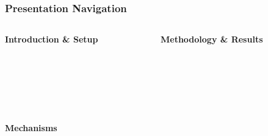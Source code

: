 \documentclass{beamer}
\begin{document}
\begin{frame}
    \label{frame:navigation}
    \frametitle{Presentation Navigation}
    
    \small %
    
    \begin{columns}[T]
        \begin{column}{0.45\textwidth}
            \centering
            \textbf{Introduction \& Setup}
            \vspace{0.1cm}
            
            \hyperlink{frame:motivation}{}\\[2pt]
            \hyperlink{frame:thispaper}{}\\[2pt]
            \hyperlink{frame:contribution}{}\\[2pt]
            \hyperlink{frame:background}{}\\[2pt]
            \hyperlink{frame:data}{}\\[2pt]
            \hyperlink{frame:trends}{}
            
            \vspace{0.2cm}
            \textbf{Mechanisms}
            \vspace{0.1cm}
            
            \hyperlink{frame:mechanisms}{}\\[2pt]
            \hyperlink{frame:birthorder}{}\\[2pt]
            \hyperlink{frame:ses}{}\\[2pt]
            \hyperlink{frame:pcinternet}{}\\[2pt]
            \hyperlink{frame:siblingdisruption}{}\\[2pt]
            \hyperlink{frame:parentaldilution}{}
        \end{column}
        
        \begin{column}{0.45\textwidth}
            \centering
            \textbf{Methodology \& Results}
            \vspace{0.1cm}
            

\end{column}
\end{columns}
\end{frame}
\end{document}
